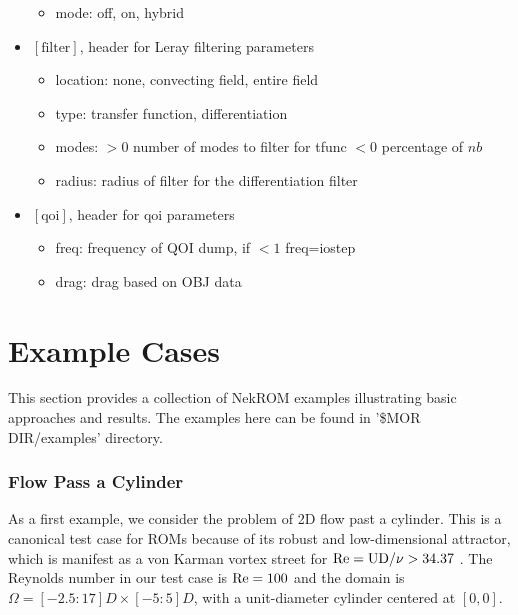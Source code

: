 \begin{itemize}
   \begin{itemize}
      \item mode: off, on, hybrid
   \end{itemize}
\item $[\text{filter}]$, header for Leray filtering parameters \cite{kaneko2020towards}\cite{tsai2022parametric}
   \begin{itemize}
      \item location: none, convecting field, entire field
      \item type: transfer function, differentiation
      \item modes: $>0$ number of modes to filter for tfunc $<0$ percentage of $nb$
      \item radius: radius of filter for the differentiation filter 
   \end{itemize}
\item $[\text{qoi}]$, header for qoi parameters
   \begin{itemize}
    \item freq: frequency of QOI dump, if $<1$ freq=iostep
    \item drag: drag based on OBJ data
   \end{itemize}
\end{itemize}

\newpage

\section{Example Cases}

\noindent
This section provides a collection of NekROM examples illustrating basic
approaches and results. The examples here can be found in '\$MOR DIR/examples'
directory.

\subsubsection{Flow Pass a Cylinder}

\noindent
As a first example, we consider the problem of 2D flow past a cylinder. 
This is a canonical test case for ROMs because of its robust and
low-dimensional attractor, which is manifest as a von Karman vortex street 
for $\rm Re = UD/\nu
>34.37$ \cite{ding2021flow}. The Reynolds number in our test case is $\rm
Re = 100$ and the domain is 
$\Omega = [-2.5 : 17]D \times [-5 : 5]D$, with a
unit-diameter cylinder centered at $[0, 0]$.


